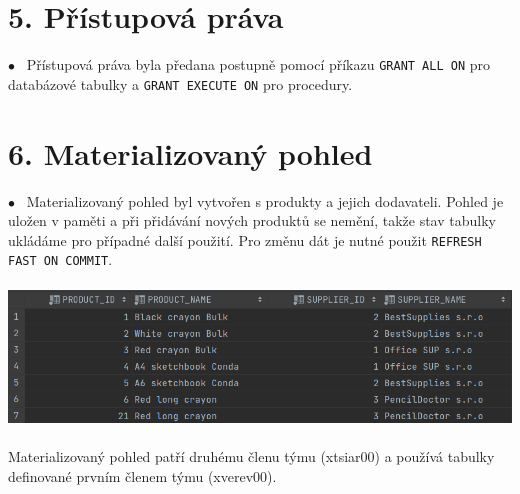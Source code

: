 \documentclass[12pt]{article}
\begin{document}
 \section*{5. Přístupová práva}
    $\bullet$~ Přístupová práva byla předana postupně pomocí příkazu \texttt{GRANT ALL ON} pro databázové tabulky a \texttt{GRANT EXECUTE ON} pro procedury.

\section*{6. Materializovaný pohled}
    $\bullet$~ Materializovaný pohled byl vytvořen s produkty a jejich dodavateli. Pohled je uložen v paměti a při přidávání nových produktů se nemění, takže stav tabulky ukládáme pro případné další použití. Pro změnu dát je nutné použit \texttt{REFRESH FAST ON COMMIT}.
    \\
    \\
    \includegraphics[scale=0.4936]{9.png}
    \\
    \\
    Materializovaný pohled patří druhému členu týmu (xtsiar00) a používá tabulky definované prvním členem týmu (xverev00).
\end{document}
